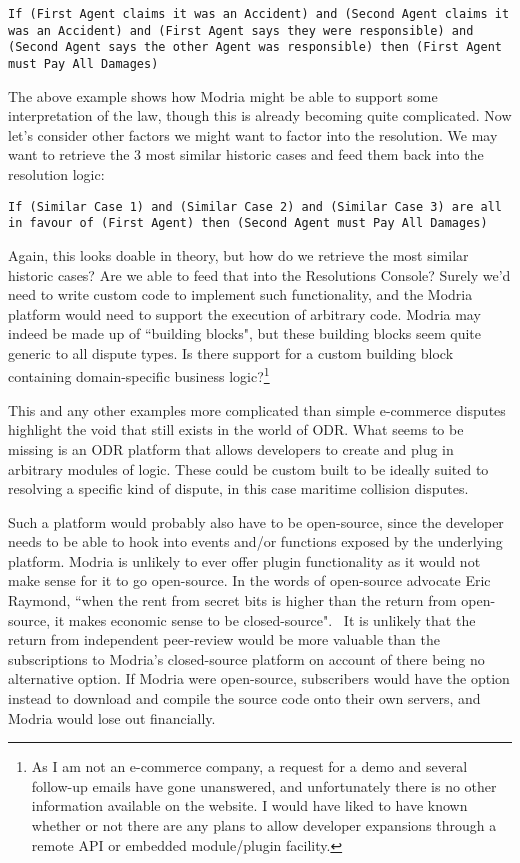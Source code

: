 \begin{lstlisting}
If (First Agent claims it was an Accident) and (Second Agent claims it was an Accident) and (First Agent says they were responsible) and (Second Agent says the other Agent was responsible) then (First Agent must Pay All Damages)
\end{lstlisting}

The above example shows how Modria might be able to support some interpretation of the law, though this is already becoming quite complicated. Now let's consider other factors we might want to factor into the resolution. We may want to retrieve the 3 most similar historic cases and feed them back into the resolution logic:

\begin{lstlisting}
If (Similar Case 1) and (Similar Case 2) and (Similar Case 3) are all in favour of (First Agent) then (Second Agent must Pay All Damages)
\end{lstlisting}

Again, this looks doable in theory, but how do we retrieve the most similar historic cases? Are we able to feed that into the Resolutions Console? Surely we'd need to write custom code to implement such functionality, and the Modria platform would need to support the execution of arbitrary code. Modria may indeed be made up of ``building blocks", but these building blocks seem quite generic to all dispute types. Is there support for a custom building block containing domain-specific business logic?\footnote{As I am not an e-commerce company, a request for a demo and several follow-up emails have gone unanswered, and unfortunately there is no other information available on the website. I would have liked to have known whether or not there are any plans to allow developer expansions through a remote API or embedded module/plugin facility.}

This and any other examples more complicated than simple e-commerce disputes highlight the void that still exists in the world of ODR. What seems to be missing is an ODR platform that allows developers to create and plug in arbitrary modules of logic. These could be custom built to be ideally suited to resolving a specific kind of dispute, in this case maritime collision disputes.

Such a platform would probably also have to be open-source, since the developer needs to be able to hook into events and/or functions exposed by the underlying platform. Modria is unlikely to ever offer plugin functionality as it would not make sense for it to go open-source. In the words of open-source advocate Eric Raymond, ``when the rent from secret bits is higher than the return from open-source, it makes economic sense to be closed-source".~\cite{eric:catB} It is unlikely that the return from independent peer-review would be more valuable than the subscriptions to Modria's closed-source platform on account of there being no alternative option. If Modria were open-source, subscribers would have the option instead to download and compile the source code onto their own servers, and Modria would lose out financially.

